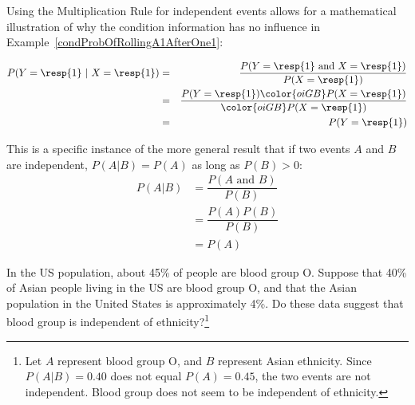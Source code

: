 Using the Multiplication Rule for independent events allows for a mathematical illustration of why the condition information has no influence in Example~\ref{condProbOfRollingA1AfterOne1}:

\begin{eqnarray*}
P(Y=\text{\resp{1}}\ |\ X=\text{\resp{1}})
	&=& \frac{P(Y=\text{\resp{1} and }X=\text{\resp{1}})}{P(X=\text{\resp{1}})} \\
	&=& \frac{P(Y=\text{\resp{1}}) \color{oiGB}P(X=\text{\resp{1}})}{\color{oiGB}P(X=\text{\resp{1}})} \\
	&=& P(Y=\text{\resp{1}}) \\
\end{eqnarray*}

This is a specific instance of the more general result that if two events $A$ and $B$ are independent, $P(A |B) = P(A)$ as long as $P(B) > 0$:
\begin{eqnarray*}
	P(A | B) &= \dfrac{P(A \text{ and } B)}{P(B)} \\
	     &= \dfrac{P(A) P(B)}{P(B)} \\
		 &= P(A)
\end{eqnarray*} 

\begin{exercise}
In the US population, about 45\% of people are blood group O. Suppose that 40\% of Asian people living in the US are blood group O, and that the Asian population in the United States is approximately 4\%. Do these data suggest that blood group is independent of ethnicity?\footnote{Let $A$ represent blood group O, and $B$ represent Asian ethnicity. Since $P(A|B) = 0.40$ does not equal $P(A) = 0.45$, the two events are not independent. Blood group does not seem to be independent of ethnicity.}
\end{exercise}


